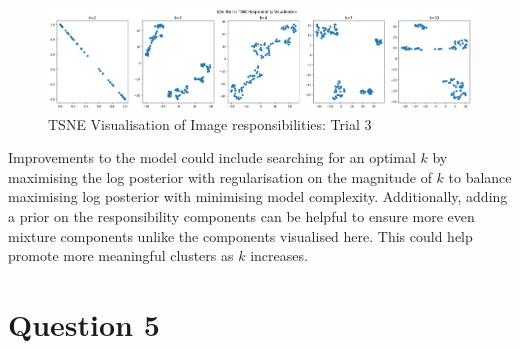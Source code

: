 \documentclass[12pt]{article}
\begin{document}
\begin{enumerate}
\begin{figure}[h]
  \centering
  \includegraphics[scale=0.35]{outputs/q3/q3e-3-tsne}
  \caption{TSNE Visualisation of Image responsibilities: Trial 3}
  \label{fig:3e-tsne-3}
\end{figure}

Improvements to the model could include searching for an optimal $k$ by maximising the log posterior with regularisation on the magnitude of $k$ to balance maximising log posterior with minimising model complexity. Additionally, adding a prior on the responsibility components can be helpful to ensure more even mixture components unlike the components visualised here. This could help promote more meaningful clusters as $k$ increases.

\end{enumerate}



\newpage
\section*{Question 5}
\end{document}
